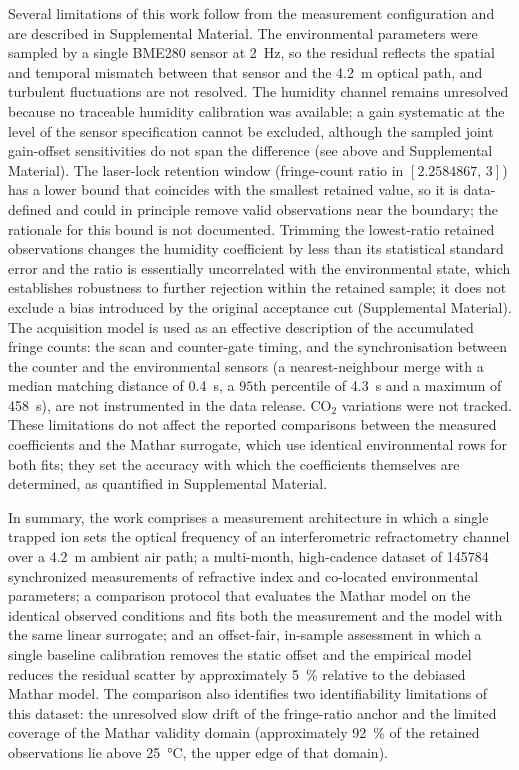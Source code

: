 \documentclass[aps,prapplied,reprint,groupedaddress,twocolumn,superscriptaddress,linenumbers]{revtex4-2}
\begin{document}
Several limitations of this work follow from the measurement configuration and are described in Supplemental Material. The environmental parameters were sampled by a single BME280 sensor at \SI{2}{\hertz}, so the residual reflects the spatial and temporal mismatch between that sensor and the \SI{4.2}{\meter} optical path, and turbulent fluctuations are not resolved. The humidity channel remains unresolved because no traceable humidity calibration was available; a gain systematic at the level of the sensor specification cannot be excluded, although the sampled joint gain-offset sensitivities do not span the difference (see above and Supplemental Material). The laser-lock retention window (fringe-count ratio in $[2.2584867,\,3]$) has a lower bound that coincides with the smallest retained value, so it is data-defined and could in principle remove valid observations near the boundary; the rationale for this bound is not documented. Trimming the lowest-ratio retained observations changes the humidity coefficient by less than its statistical standard error and the ratio is essentially uncorrelated with the environmental state, which establishes robustness to further rejection within the retained sample; it does not exclude a bias introduced by the original acceptance cut (Supplemental Material). The acquisition model is used as an effective description of the accumulated fringe counts: the scan and counter-gate timing, and the synchronisation between the counter and the environmental sensors (a nearest-neighbour merge with a median matching distance of \SI{0.4}{\second}, a $95$th percentile of \SI{4.3}{\second} and a maximum of \SI{458}{\second}), are not instrumented in the data release. CO$_2$ variations were not tracked. These limitations do not affect the reported comparisons between the measured coefficients and the Mathar surrogate, which use identical environmental rows for both fits; they set the accuracy with which the coefficients themselves are determined, as quantified in Supplemental Material.

In summary, the work comprises a measurement architecture in which a single trapped ion sets the optical frequency of an interferometric refractometry channel over a \SI{4.2}{\meter} ambient air path; a multi-month, high-cadence dataset of \num{145784} synchronized measurements of refractive index and co-located environmental parameters; a comparison protocol that evaluates the Mathar model on the identical observed conditions and fits both the measurement and the model with the same linear surrogate; and an offset-fair, in-sample assessment in which a single baseline calibration removes the static offset and the empirical model reduces the residual scatter by approximately \SI{5}{\percent} relative to the debiased Mathar model. The comparison also identifies two identifiability limitations of this dataset: the unresolved slow drift of the fringe-ratio anchor and the limited coverage of the Mathar validity domain (approximately \SI{92}{\percent} of the retained observations lie above \SI{25}{\degreeCelsius}, the upper edge of that domain).
\end{document}
